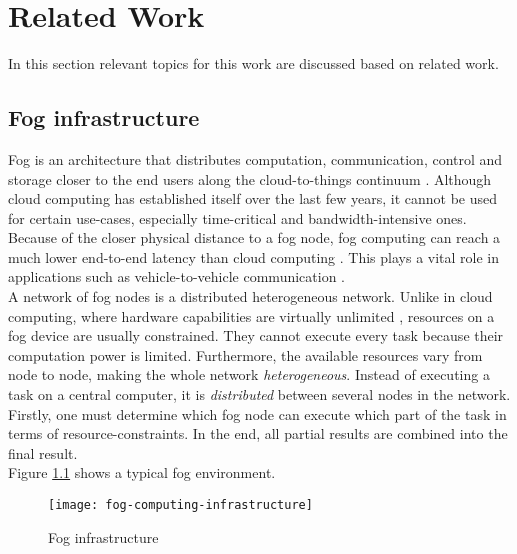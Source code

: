 \chapter{Related Work\label{cha:relwork}}
In this section relevant topics for this work are discussed based on related work.

\section{Fog infrastructure}
Fog is an architecture that distributes computation, communication, control and storage closer to the end users along the cloud-to-things continuum \cite{fog-research-opportunities}. Although cloud computing has established itself over the last few years, it cannot be used for certain use-cases, especially time-critical and bandwidth-intensive ones. Because of the closer physical distance to a fog node, fog computing can reach a much lower end-to-end latency than cloud computing \cite{mobility-aware-scheduling}\cite{novel-load-balancing}. This plays a vital role in applications such as vehicle-to-vehicle communication \cite{novel-load-balancing}.\\

A network of fog nodes is a distributed heterogeneous network. Unlike in cloud computing, where hardware capabilities are virtually unlimited \cite{fogtorch}, resources on a fog device are usually constrained. They cannot execute every task because their computation power is limited. Furthermore, the available resources vary from node to node, making the whole network \textit{heterogeneous}. Instead of executing a task on a central computer, it is \textit{distributed} between several nodes in the network.
Firstly, one must determine which fog node can execute which part of the task in terms of resource-constraints.
In the end, all partial results are combined into the final result.\\

Figure \ref{fig:foginfrastructure} shows a typical fog environment.

\begin{figure}
    \centering
    \texttt{[image: fog-computing-infrastructure]}
    \caption{Fog infrastructure}
    \label{fig:foginfrastructure}
\end{figure}

